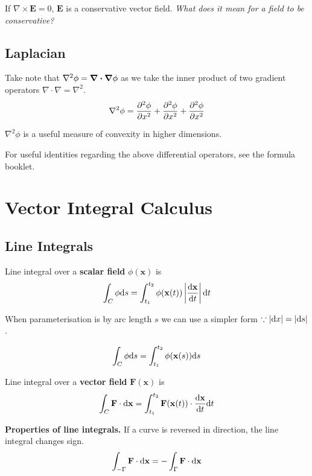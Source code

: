 If $\nabla \times \mathbf{E} = 0$, $\mathbf{E}$ is a conservative vector field. \textit{What does it mean for a field to be conservative?}

\subsection*{Laplacian}
Take note that $\nabla^2 \phi = \divergence \grad \phi$ as we take the inner product of two gradient operators $\nabla \cdot \nabla = \nabla^2$.
\begin{equation*}
    \nabla^2 \phi =  \pdv[2]{\phi}{x} + \pdv[2]{\phi}{x} + \pdv[2]{\phi}{x}
\end{equation*}

$\nabla^2 \phi$ is a useful measure of convexity in higher dimensions.
\vspace{\baselineskip}

For useful identities regarding the above differential operators, see the formula booklet.

\section{Vector Integral Calculus}

\subsection*{Line Integrals}
Line integral over a \textbf{scalar field} $\phi(\mathbf{x})$ is
\begin{equation*}
    \int_C \phi \differential s = \int_{t_1}^{t_2} \phi(\mathbf{x}(t)) \left\lvert \dv{\mathbf{x}}{t} \right\rvert \differential t
\end{equation*}

When parameterisation is by arc length $s$ we can use a simpler form $\because |\differential x| = |\differential s|$.

\begin{equation*}
    \int_C \phi \differential s = \int_{t_1}^{t_2} \phi(\mathbf{x}(s)) \differential s
\end{equation*}

Line integral over a \textbf{vector field} $\mathbf{F}(\mathbf{x})$ is
\begin{equation*}
    \int_C \mathbf{F} \cdot \differential \mathbf{x} = \int_{t_1}^{t_2} \mathbf{F}(\mathbf{x}(t))\cdot \dv{\mathbf{x}}{t}\differential t
\end{equation*}

\textbf{Properties of line integrals.} If a curve is reversed in direction, the line integral changes sign.
\begin{equation*}
    \int_{- \Gamma} \mathbf{F} \cdot \differential \mathbf{x} = - \int_{\Gamma} \mathbf{F} \cdot \differential \mathbf{x}
\end{equation*}

